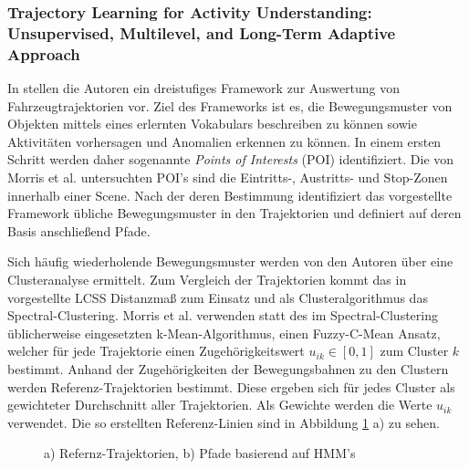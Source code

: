 \subsubsection*{Trajectory Learning for Activity Understanding: Unsupervised, Multilevel, and Long-Term Adaptive Approach}

In \cite[]{Morris2011} stellen die Autoren ein dreistufiges Framework zur Auswertung von Fahrzeugtrajektorien vor.
Ziel des Frameworks ist es, die Bewegungsmuster von Objekten mittels eines erlernten Vokabulars beschreiben zu können
sowie Aktivitäten vorhersagen und Anomalien erkennen zu können.
In einem ersten Schritt werden daher sogenannte \textit{Points of Interests} (POI) identifiziert. Die von Morris
et al. untersuchten POI's sind die Eintritts-, Austritts- und Stop-Zonen innerhalb einer Scene.
Nach der deren Bestimmung identifiziert das vorgestellte Framework übliche Bewegungsmuster in den Trajektorien
und definiert auf deren Basis anschließend Pfade.

Sich häufig wiederholende Bewegungsmuster werden von den Autoren über eine Clusteranalyse ermittelt.
Zum Vergleich der Trajektorien kommt das in \cite[]{Vlachos2002} vorgestellte LCSS Distanzmaß zum Einsatz
und als Clusteralgorithmus das Spectral-Clustering. Morris et al. verwenden statt des im Spectral-Clustering
üblicherweise eingesetzten k-Mean-Algorithmus, einen Fuzzy-C-Mean Ansatz, welcher für jede Trajektorie
einen Zugehörigkeitswert $u_{ik} \in [0, 1]$ zum Cluster $k$ bestimmt.
Anhand der Zugehörigkeiten der Bewegungsbahnen zu den Clustern werden Referenz-Trajektorien bestimmt.
Diese ergeben sich für jedes Cluster als gewichteter Durchschnitt aller Trajektorien. Als Gewichte
werden die Werte $u_{ik}$ verwendet. Die so erstellten Referenz-Linien sind in Abbildung
\ref{fig:relw_morris_results} a) zu sehen.

\begin{figure}[H]
    \centering
    \qquad
    \caption[Referenz-Trajektorien und Pfade (Morris et al.)]{a) Refernz-Trajektorien, b) Pfade basierend auf HMM's \cite[]{Morris2011}}
    \label{fig:relw_morris_results}
\end{figure}

